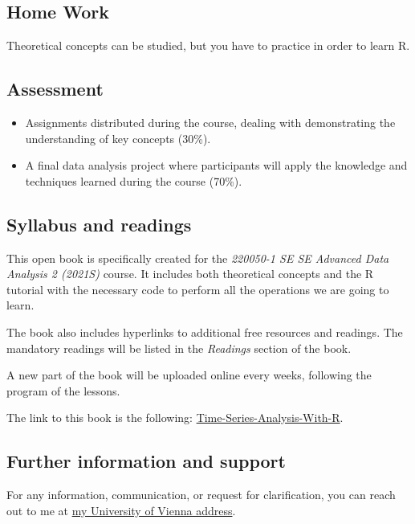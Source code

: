 \documentclass[
]{article}
\providecommand{\tightlist}{%
  \setlength{\itemsep}{0pt}\setlength{\parskip}{0pt}}
\begin{document}
\hypertarget{home-work}{%
\subsection{Home Work}\label{home-work}}

Theoretical concepts can be studied, but you have to practice in order to learn R.

\hypertarget{assessment}{%
\subsection{Assessment}\label{assessment}}

\begin{itemize}
\tightlist
\item
  Assignments distributed during the course, dealing with demonstrating the understanding of key concepts (30\%).
\item
  A final data analysis project where participants will apply the knowledge and techniques learned during the course (70\%).
\end{itemize}

\hypertarget{syllabus-and-readings}{%
\subsection{Syllabus and readings}\label{syllabus-and-readings}}

This open book is specifically created for the \emph{220050-1 SE SE Advanced Data Analysis 2 (2021S)} course. It includes both theoretical concepts and the R tutorial with the necessary code to perform all the operations we are going to learn.

The book also includes hyperlinks to additional free resources and readings.
The mandatory readings will be listed in the \emph{Readings} section of the book.

A new part of the book will be uploaded online every weeks, following the program of the lessons.

The link to this book is the following: \href{https://nicolarighetti.github.io/Time-Series-Analysis-With-R/}{Time-Series-Analysis-With-R}.

\hypertarget{further-information-and-support}{%
\subsection{Further information and support}\label{further-information-and-support}}

For any information, communication, or request for clarification, you can reach out to me at \href{https://ufind.univie.ac.at/de/person.html?id=113451}{my University of Vienna address}.
\end{document}

